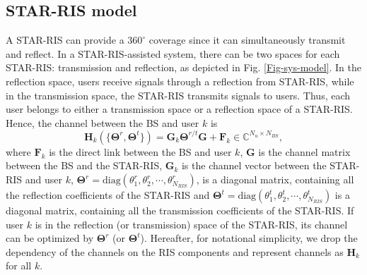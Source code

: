 \documentclass[a4, conference]{IEEEtran}
\theoremstyle{definition}
\begin{document}
\subsection{STAR-RIS model}\label{sec-ris}
A STAR-RIS can provide a $360^{\circ}$ coverage since it can simultaneously transmit and reflect. In a STAR-RIS-assisted system, there can be two spaces for each STAR-RIS: transmission and reflection, as depicted in Fig. 
\ref{Fig-sys-model}. In the reflection space, users receive signals through a reflection from STAR-RIS, while in the transmission space, the STAR-RIS transmits signals to users. Thus, each user belongs to either a transmission space or a reflection space of a STAR-RIS. Hence, the channel between the BS and user $k$ is \cite[Eq. (2)]{mu2021simultaneously} 
\begin{equation}\label{ch}
\mathbf{H}_{k}\!\left(\{\bm{\Theta}^r,\bm{\Theta}^t\}\right)\!
=
{\mathbf{G}_{k}\bm{\Theta}^{r/t}\mathbf{G}}%
+\!
{\mathbf{F}_{k}}%
\in \mathbb{C}^{N_u\times N_{BS}}
,
\end{equation}
where $\mathbf{F}_{k}$ %
is the direct link between the BS and user $k$, $\mathbf{G}$ %
is the channel matrix between the BS and the STAR-RIS, 
$\mathbf{G}_{k}$ %
is the channel vector between the STAR-RIS and user $k$, 
$\bm{\Theta}^r%
=\text{diag}\left(\theta_{1}^r, \theta_{2}^r,\cdots,\theta_{{N_{RIS}}}^r\right)$, 
is a diagonal matrix, containing all the reflection coefficients of the STAR-RIS and %
$\bm{\Theta}^t%
=\text{diag}\left(\theta_{1}^t, \theta_{2}^t,\cdots,\theta_{{N_{RIS}}}^t\right)$ 
is a diagonal matrix, containing all the transmission coefficients of the STAR-RIS. If user $k$ is in the reflection (or transmission) space of the STAR-RIS, its channel can be optimized by $\bm{\Theta}^r$ (or $\bm{\Theta}^t$). Hereafter, for notational simplicity, we drop the dependency of the channels on the RIS components and represent channels as $\mathbf{H}_{k}$ for all $k$. 
\end{document}
